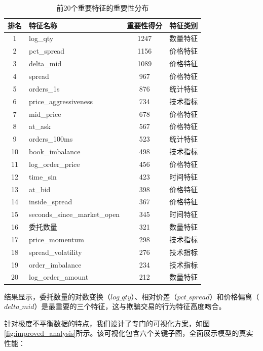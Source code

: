 \documentclass[12pt,a4paper]{article}
\begin{document}
\begin{table}[H]
\centering
\caption{前20个重要特征的重要性分布}
\label{fig:feature_importance}
\begin{tabular}{clcc}
\toprule
排名 & 特征名称 & 重要性得分 & 特征类别 \\
\midrule
1 & log\_qty & 1247 & 数量特征 \\
2 & pct\_spread & 1156 & 价格特征 \\
3 & delta\_mid & 1089 & 价格特征 \\
4 & spread & 967 & 价格特征 \\
5 & orders\_1s & 876 & 统计特征 \\
6 & price\_aggressiveness & 734 & 技术指标 \\
7 & mid\_price & 678 & 价格特征 \\
8 & at\_ask & 567 & 价格特征 \\
9 & orders\_100ms & 523 & 统计特征 \\
10 & book\_imbalance & 498 & 技术指标 \\
11 & log\_order\_price & 456 & 价格特征 \\
12 & time\_sin & 423 & 时间特征 \\
13 & at\_bid & 398 & 价格特征 \\
14 & inside\_spread & 367 & 价格特征 \\
15 & seconds\_since\_market\_open & 345 & 时间特征 \\
16 & 委托数量 & 321 & 数量特征 \\
17 & price\_momentum & 298 & 技术指标 \\
18 & spread\_volatility & 276 & 技术指标 \\
19 & order\_imbalance & 234 & 技术指标 \\
20 & log\_order\_amount & 212 & 数量特征 \\
\bottomrule
\end{tabular}
\end{table}

结果显示，委托数量的对数变换（$log\_qty$）、相对价差（$pct\_spread$）和价格偏离（$delta\_mid$）是最重要的三个特征，这与欺骗交易的行为特征高度吻合。

针对极度不平衡数据的特点，我们设计了专门的可视化方案，如图\ref{fig:improved_analysis}所示。该可视化包含六个关键子图，全面展示模型的真实性能：
\end{document}
